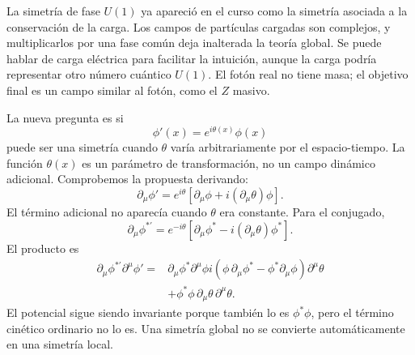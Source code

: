 La simetría de fase \(U(1)\) ya apareció en el curso como la simetría asociada a la conservación de la carga. Los campos de partículas cargadas son complejos, y multiplicarlos por una fase común deja inalterada la teoría global. Se puede hablar de carga eléctrica para facilitar la intuición, aunque la carga podría representar otro número cuántico \(U(1)\). El fotón real no tiene masa; el objetivo final es un campo similar al fotón, como el \(Z\) masivo.

La nueva pregunta es si
\begin{equation}
  \phi'(x)=e^{i\theta(x)}\phi(x)
  \label{eq:l07-local-u1}
\end{equation}
puede ser una simetría cuando \(\theta\) varía arbitrariamente por el espacio-tiempo. La función \(\theta(x)\) es un parámetro de transformación, no un campo dinámico adicional. Comprobemos la propuesta derivando:
\begin{equation}
  \partial_\mu\phi'
  =e^{i\theta}
   \left[\partial_\mu\phi+i(\partial_\mu\theta)\phi\right].
  \label{eq:l07-local-derivative}
\end{equation}
El término adicional no aparecía cuando \(\theta\) era constante. Para el conjugado,
\begin{equation}
  \partial_\mu\phi^{*\prime}
  =e^{-i\theta}
   \left[\partial_\mu\phi^*-i(\partial_\mu\theta)\phi^*\right].
\end{equation}
El producto es
\begin{align}
  \partial_\mu\phi^{*\prime}\partial^\mu\phi'
  ={}&
  \partial_\mu\phi^*\partial^\mu\phi
  i\left(
      \phi\,\partial_\mu\phi^*
      -\phi^*\partial_\mu\phi
    \right)\partial^\mu\theta
  \nonumber\\
  &+\phi^*\phi\,
    \partial_\mu\theta\,\partial^\mu\theta.
  \label{eq:l07-local-failure}
\end{align}
El potencial sigue siendo invariante porque también lo es \(\phi^*\phi\), pero el término cinético ordinario no lo es. Una simetría global no se convierte automáticamente en una simetría local.

\begin{classroomqa}
\end{classroomqa}

